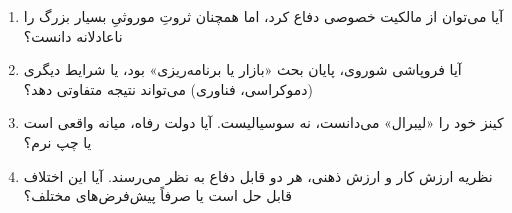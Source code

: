\vspace{20pt}

\begin{questionbox}

\begin{enumerate}[nosep, rightmargin=1cm]
    \item آیا می‌توان از مالکیت خصوصی دفاع کرد، اما همچنان ثروتِ موروثیِ بسیار بزرگ را ناعادلانه دانست؟

    \item آیا فروپاشی شوروی، پایان بحث «بازار یا برنامه‌ریزی» بود، یا شرایط دیگری (دموکراسی، فناوری) می‌تواند نتیجه متفاوتی دهد؟

    \item کینز خود را «لیبرال» می‌دانست، نه سوسیالیست. آیا دولت رفاه، میانه واقعی است یا چپ نرم؟

    \item نظریه ارزش کار و ارزش ذهنی، هر دو قابل دفاع به نظر می‌رسند. آیا این اختلاف قابل حل است یا صرفاً پیش‌فرض‌های مختلف؟
\end{enumerate}

\end{questionbox}


